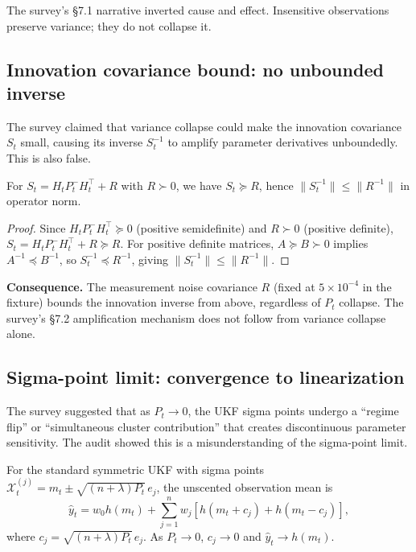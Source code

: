 The survey's §7.1 narrative inverted cause and effect. Insensitive observations preserve variance; they do not collapse it.

\subsection{Innovation covariance bound: no unbounded inverse}

The survey claimed that variance collapse could make the innovation covariance $S_t$ small, causing its inverse $S_t^{-1}$ to amplify parameter derivatives unboundedly. This is also false.

\begin{proposition}
\label{prop:innovation-bound}
For $S_t = H_t P_t^- H_t^\top + R$ with $R \succ 0$, we have $S_t \succeq R$, hence $\|S_t^{-1}\| \leq \|R^{-1}\|$ in operator norm.
\end{proposition}

\begin{proof}
Since $H_t P_t^- H_t^\top \succeq 0$ (positive semidefinite) and $R \succ 0$ (positive definite), $S_t = H_t P_t^- H_t^\top + R \succeq R$. For positive definite matrices, $A \succeq B \succ 0$ implies $A^{-1} \preceq B^{-1}$, so $S_t^{-1} \preceq R^{-1}$, giving $\|S_t^{-1}\| \leq \|R^{-1}\|$.
\end{proof}

\textbf{Consequence.} The measurement noise covariance $R$ (fixed at $5 \times 10^{-4}$ in the fixture) bounds the innovation inverse from above, regardless of $P_t$ collapse. The survey's §7.2 amplification mechanism does not follow from variance collapse alone.

\subsection{Sigma-point limit: convergence to linearization}

The survey suggested that as $P_t \to 0$, the UKF sigma points undergo a ``regime flip'' or ``simultaneous cluster contribution'' that creates discontinuous parameter sensitivity. The audit showed this is a misunderstanding of the sigma-point limit.

\begin{proposition}
\label{prop:sigma-point-limit}
For the standard symmetric UKF with sigma points $\mathcal{X}_t^{(j)} = m_t \pm \sqrt{(n + \lambda) P_t} \, e_j$, the unscented observation mean is
\[
\hat{y}_t = w_0 h(m_t) + \sum_{j=1}^n w_j [h(m_t + c_j) + h(m_t - c_j)],
\]
where $c_j = \sqrt{(n + \lambda) P_t} \, e_j$. As $P_t \to 0$, $c_j \to 0$ and $\hat{y}_t \to h(m_t)$.
\end{proposition}


